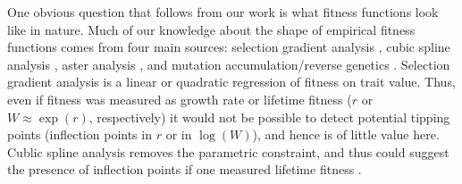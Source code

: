 \documentclass[12pt,letterpaper]{article} %
\begin{document}
One obvious question that follows from our work is what fitness functions look like in nature.
Much of our knowledge about the shape of empirical fitness functions comes from four main sources: selection gradient analysis \citep{Lande1983}, cubic spline analysis \citep{Schluter1988}, aster analysis \citep{Shaw2008,Shaw2010}, and mutation accumulation/reverse genetics \citep[reviewed in][]{deVisser2014}.
Selection gradient analysis is a linear or quadratic regression of fitness on trait value.
Thus, even if fitness was measured as growth rate or lifetime fitness ($r$ or $W \approx \exp(r)$, respectively) it would not be possible to detect potential tipping points (inflection points in $r$ or in $\log(W)$), and hence is of little value here.
Cublic spline analysis removes the parametric constraint, and thus could suggest the presence of inflection points if one measured lifetime fitness \citep[e.g.,][]{Reale2003a,Wilson2005}.
\end{document}
